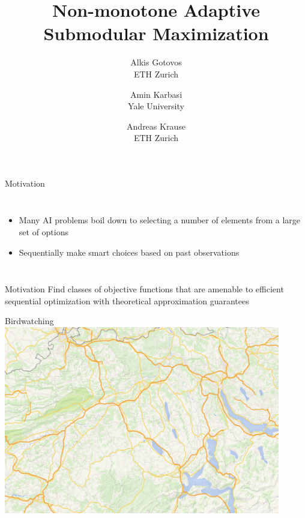 \documentclass[xetex,10pt,mathserif]{beamer}
\title[Non-monotone Adaptive Submodular Maximization]
{Non-monotone Adaptive Submodular Maximization}
\author[Alkis Gotovos]{
\vspace{1in}
\normalsize
\parbox{1in}{Alkis Gotovos\\{\footnotesize ETH Zurich}}\and
\parbox{1in}{Amin Karbasi\\{\footnotesize Yale University}}\and
\parbox{1in}{Andreas Krause\\{\footnotesize ETH Zurich}}
}
\date[May 4, 2015]{
\begin{center}
{\normalsize
ICML '15
}
\end{center}
}
\begin{document}


\begin{frame}{Motivation}
\begin{columns}[c]
\begin{itemize}
\item<1-> Many AI problems boil down to selecting a number of elements from a large set of options
\vspace{3em}
\item<2-> Sequentially make smart choices based on past observations
\end{itemize}
\end{columns}
\end{frame}

\begin{frame}{Motivation}
\large{Find classes of objective functions that are amenable to efficient sequential optimization with theoretical approximation guarantees}
\end{frame}

\begin{frame}{Birdwatching}
\centering
\includegraphics[width=4.75in]{figures/map.pdf}
\end{frame}
\end{document}
